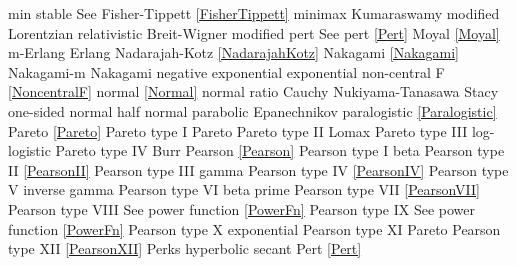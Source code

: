 min stable						\dotfill	See Fisher-Tippett \eqref{FisherTippett}	\ncite
minimax 						\dotfill	Kumaraswamy 						 	%
modified Lorentzian				\dotfill	relativistic Breit-Wigner					%
modified pert					\dotfill	See pert \eqref{Pert}					\ncite	%
Moyal						\dotfill	\eqref{Moyal}						\ncite	
m-Erlang						\dotfill	Erlang 							\ncite	%
%
Nadarajah-Kotz					\dotfill	\eqref{NadarajahKotz}				\mcite{\self}	%
Nakagami 					\dotfill	\eqref{Nakagami} 					\ncite	%
Nakagami-m 					\dotfill	Nakagami 						\ncite   	%
negative exponential				\dotfill	exponential 						\ncite	%
non-central F					\dotfill		\eqref{NoncentralF}				\ncite	%
normal 						\dotfill	\eqref{Normal}						\ncite	%
normal ratio  					\dotfill	Cauchy 							\ncite	%
Nukiyama-Tanasawa 			\dotfill	Stacy 							   	%
%
one-sided normal  				\dotfill	half normal						\ncite	%
parabolic						\dotfill	Epanechnikov						\ncite
paralogistic					\dotfill	\eqref{Paralogistic} 					\ncite	%
Pareto						\dotfill	\eqref{Pareto}						\ncite	%
Pareto type I					\dotfill	Pareto							\ncite	%
Pareto type II					\dotfill	Lomax 							\ncite	%
Pareto type III					\dotfill	log-logistic						\ncite	%
Pareto type IV					\dotfill	Burr								\ncite	%
Pearson			 			\dotfill	\eqref{Pearson}						\ncite	%
Pearson type I					\dotfill	beta 								\ncite	%
Pearson type II					\dotfill	\eqref{PearsonII}					\ncite	%
Pearson type III   				\dotfill	gamma 							\ncite	%
Pearson type IV   				\dotfill	\eqref{PearsonIV} 					\ncite	%
Pearson type V    				\dotfill	inverse gamma						\ncite	%
Pearson type VI				\dotfill	beta prime 						\ncite	%
Pearson type VII				\dotfill	\eqref{PearsonVII} 					\ncite	%
Pearson type VIII				\dotfill	See power function \eqref{PowerFn}		\ncite	%
Pearson type IX				\dotfill	See power function \eqref{PowerFn}		\ncite	%
Pearson type X    				\dotfill	exponential						\ncite	%
Pearson type XI    				\dotfill	Pareto							   	%
Pearson type XII 				\dotfill	\eqref{PearsonXII}					\ncite	%
Perks						\dotfill	hyperbolic secant 					\ncite	%
Pert							\dotfill	\eqref{Pert} 						\ncite	%
